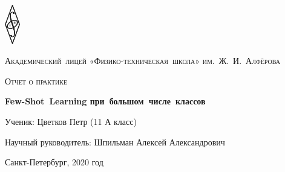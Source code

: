 \documentclass[a4paper, 12pt]{report}
\begin{document}
\begin{titlepage}
	\centering
	\includegraphics[width=0.05\textwidth]{pths}\par\vspace{0.5cm}
	{\scshape\Large  Академический~лицей «Физико-техническая~школа» им.~Ж.~И.~Алфёрова \par}
	\vspace{1.0cm}
	{\scshape\large Отчет о практике \par}
	\vspace{3cm}
	{\huge\bfseries Few-Shot~Learning при~большом~числе~классов \par}
	\vspace{3cm}
	{\large Ученик: Цветков Петр (11 А класс) \par}
	\vspace{0.25cm}
	{\large Научный руководитель: Шпильман Алексей Александрович \par}


	\vfill

	{\large Санкт-Петербург, 2020 год\par}
\end{titlepage}
	
	\begin{abstract}
	Few-Shot Learning (FSL), то есть классификация изображений на основе малого числа примеров - активно исследуемая в наше время задача в области компьютерного зрения. В данной работе, помимо традиционного сценария FSL (5 классов, по 1 или 5 примеров на класс), рассматривается усложненная и более приближенная к практике версия задачи, в которой количество классов много больше, чем число образцов для каждого класса (100 классов, по 5 примеров на класс), а так же задача применения опыта, полученного из одного датасета, к другому. Для этого были выбраны модели, основанных на т. н. ProtoNet Classifier \cite{closerlook}. Были проанализированы современные исследования в этой области, описанные в них методы реализованы, по-разному скомбинированы и протестированы в описанных сценариях. Для оценки использовался как популярный среди исследователей датасет miniImageNet \cite{imagenet}, так и собранный самостоятельно для многоклассовой задачи датасет, представляющий собой подмножество GoogleLandmarks \cite{google}. В результате работы были определены наиболее эффективные методы решения FSL для различных сценариев, что может быть полезно как при будущих исследованиях, так и при создании промышленных решений в области компьютерного зрения.
	\end{abstract}
	
\end{document}
